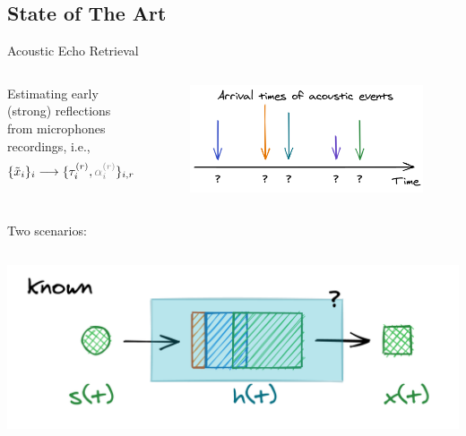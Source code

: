 \subsection*{State of The Art}

\begin{frame}[t]{Acoustic Echo Retrieval \hfill\faBook}
    \begin{columns}[T,onlytextwidth]
            Estimating early (strong) reflections from microphones recordings, i.e.,
            \begin{equation*}
                \{\contMic_i\}_i \longrightarrow \{ \tauir, \textcolor{gray}{\ampir} \}_{i,r}
            \end{equation*}
            \begin{figure}
                \centering
                \includegraphics[width=\textwidth]{./figures/arrivals.png}
            \end{figure}
    \end{columns}

    \pause
    \begin{block}{Two scenarios:}

    \begin{columns}[onlytextwidth]
        \centering
        \includegraphics[width=.9\textwidth]{./figures/active.png}


\end{columns}
\end{block}
\end{frame}
